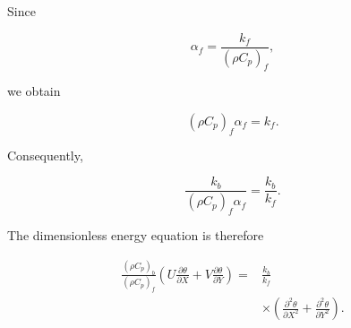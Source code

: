 \documentclass[preprint,3p,number]{elsarticle}
\begin{document}
\par\vspace{\baselineskip}
Since

\begin{equation}
\alpha_f=\frac{k_f}{(\rho C_p)_f},
\end{equation}

we obtain

\begin{equation}
(\rho C_p)_f\alpha_f=k_f.
\end{equation}

Consequently,

\begin{equation}
\frac{k_b}{(\rho C_p)_f\alpha_f}
=
\frac{k_b}{k_f}.
\end{equation}

\par\vspace{\baselineskip}
The dimensionless energy equation is therefore

\begin{equation}
\boxed{
\begin{aligned}
\frac{(\rho C_p)_b}{(\rho C_p)_f}
\left(
U\frac{\partial\theta}{\partial X}
+
V\frac{\partial\theta}{\partial Y}
\right)
={}&
\frac{k_b}{k_f}
\\
&\times
\left(
\frac{\partial^2\theta}{\partial X^2}
+
\frac{\partial^2\theta}{\partial Y^2}
\right).
\end{aligned}
}
\label{eq:energy_dimensionless}
\end{equation}
\end{document}
